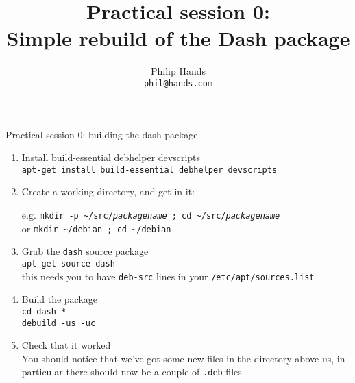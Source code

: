 \documentclass[10pt,final]{beamer}
\title[Practical session 0: dash]{Practical session 0:\\ Simple rebuild of the Dash package}
\author[]{Philip Hands\\{\small\texttt{phil@hands.com}}}
\institute{\texttt{[image: figs/openlogo-nd.pdf]}}
\date{}
\begin{document}
\frame{\titlepage}

\begin{frame}{Practical session 0: building the dash package}
\begin{enumerate}
\item Install build-essential debhelper devscripts\\
  {\small \texttt{apt-get install build-essential debhelper devscripts}}
  \hbr
\item Create a working directory, and get in it:\\
  \begin{tabbing}
    e.g. \= \texttt{mkdir -p \textasciitilde/src/\textsl{packagename} ; cd \textasciitilde/src/\textsl{packagename}}\\
    or   \> \texttt{mkdir \textasciitilde/debian ; cd \textasciitilde/debian}
  \end{tabbing}
  \hbr
  
\item Grab the \texttt{dash} source package\\
  \texttt{apt-get source dash}\\ 
  {\small this needs you to have \texttt{deb-src} lines in your \texttt{/etc/apt/sources.list}}
  \hbr
\item Build the package\\
  {\small \texttt{cd dash-*\\ debuild -us -uc}}

  \hbr
\item Check that it worked\\
  {\small You should notice that we've got some new
    files in the directory above us, in particular
    there should now be a couple of \texttt{.deb}
    files}
\end{enumerate}
\end{frame}
\end{document}
